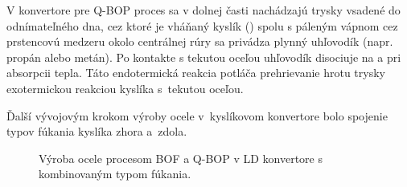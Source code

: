 V konvertore pre Q-BOP proces sa v dolnej časti nachádzajú trysky vsadené do odnímateľného dna, cez ktoré je vháňaný kyslík () spolu s páleným vápnom cez prstencovú medzeru okolo centrálnej rúry sa privádza plynný uhľovodík (napr. propán alebo metán). Po kontakte s tekutou oceľou uhľovodík disociuje na  a  pri absorpcii tepla. Táto endotermická reakcia potláča prehrievanie hrotu trysky exotermickou reakciou kyslíka s~tekutou oceľou.

Ďalší vývojovým krokom výroby ocele v~kyslíkovom konvertore bolo spojenie typov fúkania kyslíka zhora a~zdola.

\begin{figure}[h!tbp]
\centering
{}
\hfill
{}
\caption{Výroba ocele procesom BOF a Q-BOP v LD konvertore s kombinovaným typom fúkania.}
\label{o:4}
\end{figure}


